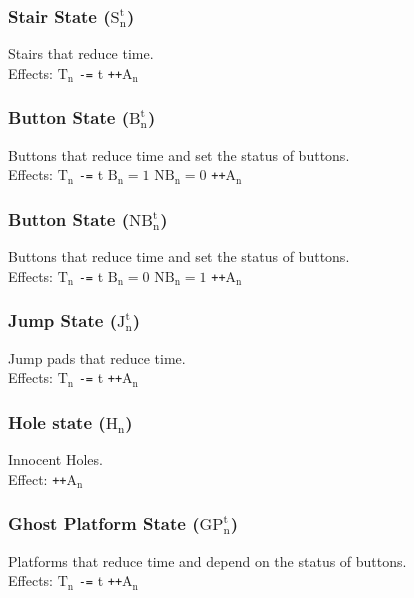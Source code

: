 \documentclass[10pt,twocolumn]{article}
\begin{document}
\subsubsection*{Stair State ($\text{S}_{\text{n}}^{\text{t}}$)}
Stairs that reduce time. \\
Effects: $\text{T}_{\text{n}}$ \texttt{-=} t \quad \texttt{++}$\text{A}_{\text{n}}$

\subsubsection*{Button State ($\text{B}_{\text{n}}^{\text{t}}$)}
Buttons that reduce time and set the status of buttons. \\
Effects: $\text{T}_{\text{n}}$ \texttt{-=} t \quad $\text{B}_{\text{n}} = 1$ \quad $\text{NB}_{\text{n}} = 0$ \quad \texttt{++}$\text{A}_{\text{n}}$

\subsubsection*{Button State ($\text{NB}_{\text{n}}^{\text{t}}$)}
Buttons that reduce time and set the status of buttons. \\
Effects: $\text{T}_{\text{n}}$ \texttt{-=} t \quad $\text{B}_{\text{n}} = 0$ \quad $\text{NB}_{\text{n}} = 1$ \quad \texttt{++}$\text{A}_{\text{n}}$

\subsubsection*{Jump State ($\text{J}_{\text{n}}^{\text{t}}$)}
Jump pads that reduce time. \\
Effects: $\text{T}_{\text{n}}$ \texttt{-=} t \quad \texttt{++}$\text{A}_{\text{n}}$

\subsubsection*{Hole state ($\text{H}_{\text{n}}$)}
Innocent Holes. \\
Effect: \texttt{++}$\text{A}_{\text{n}}$

\subsubsection*{Ghost Platform State ($\text{GP}_{\text{n}}^{\text{t}}$)}
Platforms that reduce time and depend on the status of buttons. \\
Effects: $\text{T}_{\text{n}}$ \texttt{-=} t \quad \texttt{++}$\text{A}_{\text{n}}$
\end{document}
